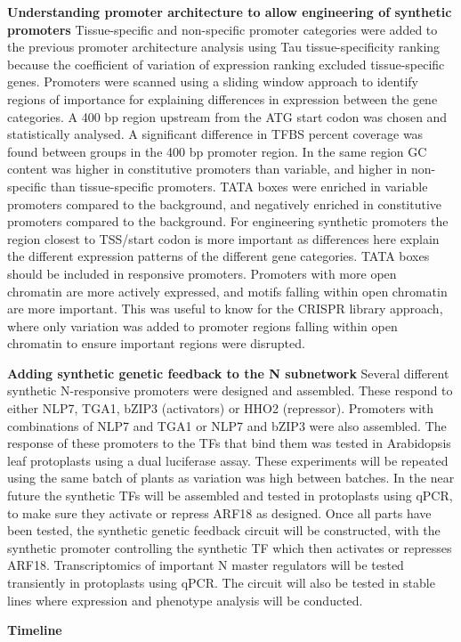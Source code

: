 \documentclass[../main.tex]{subfiles}
\begin{document}
\textbf{Understanding promoter architecture to allow engineering of synthetic promoters}
Tissue-specific and non-specific promoter categories were added to the previous promoter architecture analysis using Tau tissue-specificity ranking because the coefficient of variation of expression ranking excluded tissue-specific genes. Promoters were scanned using a sliding window approach to identify regions of importance for explaining differences in expression between the gene categories. A 400 bp region upstream from the ATG start codon was chosen and statistically analysed. A significant difference in TFBS percent coverage was found between groups in the 400 bp promoter region. In the same region GC content was higher in constitutive promoters than variable, and higher in non-specific than tissue-specific promoters. TATA boxes were enriched in variable promoters compared to the background, and negatively enriched in constitutive promoters compared to the background.
For engineering synthetic promoters the region closest to TSS/start codon is more important as differences here explain the different expression patterns of the different gene categories. TATA boxes should be included in responsive promoters. Promoters with more open chromatin are more actively expressed, and motifs falling within open chromatin are more important. This was useful to know for the CRISPR library approach, where only variation was added to promoter regions falling within open chromatin to ensure important regions were disrupted.

\textbf{Adding synthetic genetic feedback to the N subnetwork}
Several different synthetic N-responsive promoters were designed and assembled. These respond to either NLP7, TGA1, bZIP3 (activators) or HHO2 (repressor). Promoters with combinations of NLP7 and TGA1 or NLP7 and bZIP3 were also assembled. The response of these promoters to the TFs that bind them was tested in Arabidopsis leaf protoplasts using a dual luciferase assay. These experiments will be repeated using the same batch of plants as variation was high between batches. In the near future the synthetic TFs will be assembled and tested in protoplasts using qPCR, to make sure they activate or repress ARF18 as designed. Once all parts have been tested, the synthetic genetic feedback circuit will be constructed, with the synthetic promoter controlling the synthetic TF which then activates or represses ARF18. Transcriptomics of important N master regulators will be tested transiently in protoplasts using qPCR. The circuit will also be tested in stable lines where expression and phenotype analysis will be conducted.

\textbf{Timeline}
\end{document}
